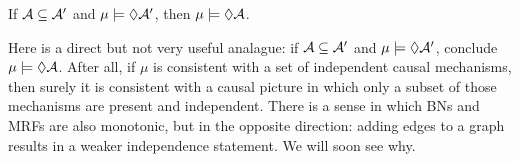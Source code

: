\begin{prop}
        \label{prop:mono}
    If $\mathcal A \subseteq \mathcal A'$ and 
    $\mu \models \Diamond\mathcal A'$, then $\mu \models \Diamond\mathcal A$.
\end{prop}
Here is a direct but not very useful analague: if $\mathcal A \subseteq \mathcal A'$ and $\mu \models \Diamond\mathcal A'$, conclude $\mu \models \Diamond\mathcal A$. 
%
After all, if 
$\mu$ is consistent with a set of independent causal mechanisms, then surely 
it is
consistent with a causal picture
in which
only a subset of those mechanisms 
are
present and independent.  
{%
There is a sense in which 
    BNs and MRFs are also monotonic,
    but in the opposite direction:
    adding edges to a graph results in a weaker
    independence statement.
    We will soon see why.
}%


